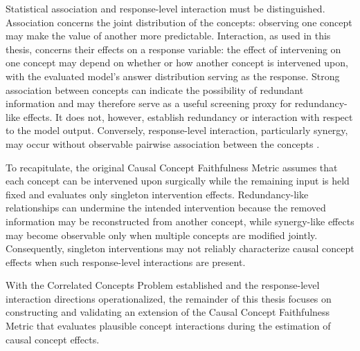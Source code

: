 Statistical association and response-level interaction must be distinguished. Association concerns the joint distribution of the concepts: observing one concept may make the value of another more predictable. Interaction, as used in this thesis, concerns their effects on a response variable: the effect of intervening on one concept may depend on whether or how another concept is intervened upon, with the evaluated model's answer distribution serving as the response. Strong association between concepts can indicate the possibility of redundant information and may therefore serve as a useful screening proxy for redundancy-like effects. It does not, however, establish redundancy or interaction with respect to the model output. Conversely, response-level interaction, particularly synergy, may occur without observable pairwise association between the concepts \cite{picaInvariantComponentsSynergy2017}.

To recapitulate, the original Causal Concept Faithfulness Metric assumes that each concept can be intervened upon surgically while the remaining input is held fixed and evaluates only singleton intervention effects. Redundancy-like relationships can undermine the intended intervention because the removed information may be reconstructed from another concept, while synergy-like effects may become observable only when multiple concepts are modified jointly. Consequently, singleton interventions may not reliably characterize causal concept effects when such response-level interactions are present.

With the Correlated Concepts Problem established and the response-level interaction directions operationalized, the remainder of this thesis focuses on constructing and validating an extension of the Causal Concept Faithfulness Metric that evaluates plausible concept interactions during the estimation of causal concept effects.
